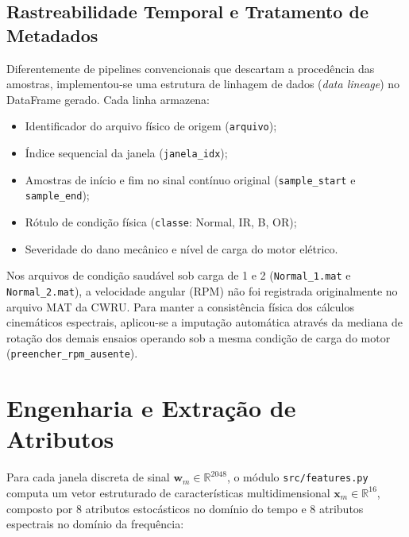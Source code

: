 \subsection{Rastreabilidade Temporal e Tratamento de Metadados}
Diferentemente de pipelines convencionais que descartam a procedência das amostras, implementou-se uma estrutura de linhagem de dados (\textit{data lineage}) no DataFrame gerado. Cada linha armazena:
\begin{itemize}
    \item Identificador do arquivo físico de origem (\texttt{arquivo});
    \item Índice sequencial da janela (\texttt{janela\_idx});
    \item Amostras de início e fim no sinal contínuo original (\texttt{sample\_start} e \texttt{sample\_end});
    \item Rótulo de condição física (\texttt{classe}: Normal, IR, B, OR);
    \item Severidade do dano mecânico e nível de carga do motor elétrico.
\end{itemize}

Nos arquivos de condição saudável sob carga de 1 e \SI{2}{\horsepower} (\texttt{Normal\_1.mat} e \texttt{Normal\_2.mat}), a velocidade angular ($\text{RPM}$) não foi registrada originalmente no arquivo MAT da CWRU. Para manter a consistência física dos cálculos cinemáticos espectrais, aplicou-se a imputação automática através da mediana de rotação dos demais ensaios operando sob a mesma condição de carga do motor (\texttt{preencher\_rpm\_ausente}).

\section{Engenharia e Extração de Atributos}
\label{sec:extracao_features}

Para cada janela discreta de sinal $\mathbf{w}_m \in \mathbb{R}^{2048}$, o módulo \texttt{src/features.py} computa um vetor estruturado de características multidimensional $\mathbf{x}_m \in \mathbb{R}^{16}$, composto por 8 atributos estocásticos no domínio do tempo e 8 atributos espectrais no domínio da frequência:

